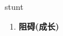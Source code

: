 
\begin{frame}
{\huge stunt}
\begin{center}
\begin{enumerate}\Large
  \item \textbf{阻碍(成长)}
\end{enumerate}
\end{center}
\end{frame}
